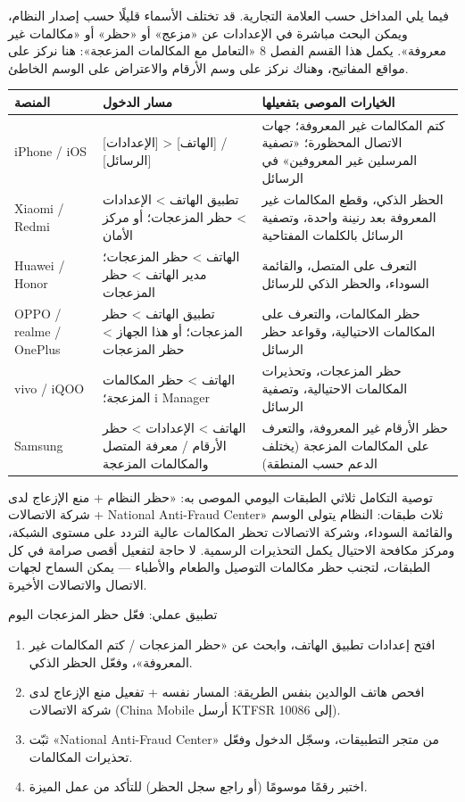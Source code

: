 
فيما يلي المداخل حسب العلامة التجارية. قد تختلف الأسماء قليلًا حسب إصدار النظام، ويمكن البحث مباشرة في الإعدادات عن «مزعج» أو «حظر» أو «مكالمات غير معروفة». يكمل هذا القسم الفصل 8 «التعامل مع المكالمات المزعجة»: هنا نركز على مواقع المفاتيح، وهناك نركز على وسم الأرقام والاعتراض على الوسم الخاطئ.

\begin{center}
\begin{tabularx}{\linewidth}{|X|X|X|}
\hline
\textbf{المنصة} & \textbf{مسار الدخول} & \textbf{الخيارات الموصى بتفعيلها} \tabularnewline
\hline
iPhone / iOS & {}[الإعدادات] > [الهاتف] / [الرسائل] & كتم المكالمات غير المعروفة؛ جهات الاتصال المحظورة؛ «تصفية المرسلين غير المعروفين» في الرسائل \tabularnewline
Xiaomi / Redmi & تطبيق الهاتف > الإعدادات > حظر المزعجات؛ أو مركز الأمان & الحظر الذكي، وقطع المكالمات غير المعروفة بعد رنينة واحدة، وتصفية الرسائل بالكلمات المفتاحية \tabularnewline
Huawei / Honor & الهاتف > حظر المزعجات؛ مدير الهاتف > حظر المزعجات & التعرف على المتصل، والقائمة السوداء، والحظر الذكي للرسائل \tabularnewline
OPPO / realme / OnePlus & تطبيق الهاتف > حظر المزعجات؛ أو هذا الجهاز > حظر المزعجات & حظر المكالمات، والتعرف على المكالمات الاحتيالية، وقواعد حظر الرسائل \tabularnewline
vivo / iQOO & الهاتف > حظر المكالمات المزعجة؛ i Manager & حظر المزعجات، وتحذيرات المكالمات الاحتيالية، وتصفية الرسائل \tabularnewline
Samsung & الهاتف > الإعدادات > حظر الأرقام / معرفة المتصل والمكالمات المزعجة & حظر الأرقام غير المعروفة، والتعرف على المكالمات المزعجة (يختلف الدعم حسب المنطقة) \tabularnewline
\hline
\end{tabularx}
\end{center}

\begin{tcbinfo}{توصية التكامل ثلاثي الطبقات}
اليومي الموصى به: «حظر النظام + منع الإزعاج لدى شركة الاتصالات + National Anti-Fraud Center» ثلاث طبقات: النظام يتولى الوسم والقائمة السوداء، وشركة الاتصالات تحظر المكالمات عالية التردد على مستوى الشبكة، ومركز مكافحة الاحتيال يكمل التحذيرات الرسمية. لا حاجة لتفعيل أقصى صرامة في كل الطبقات، لتجنب حظر مكالمات التوصيل والطعام والأطباء — يمكن السماح لجهات الاتصال والاتصالات الأخيرة.

\end{tcbinfo}

\begin{tcbpractice}{تطبيق عملي: فعّل حظر المزعجات اليوم}
\begin{enumerate}
  \item افتح إعدادات تطبيق الهاتف، وابحث عن «حظر المزعجات / كتم المكالمات غير المعروفة»، وفعّل الحظر الذكي.
  \item افحص هاتف الوالدين بنفس الطريقة: المسار نفسه + تفعيل منع الإزعاج لدى شركة الاتصالات (China Mobile أرسل KTFSR إلى 10086).
  \item ثبّت «National Anti-Fraud Center» من متجر التطبيقات، وسجّل الدخول وفعّل تحذيرات المكالمات.
  \item اختبر رقمًا موسومًا (أو راجع سجل الحظر) للتأكد من عمل الميزة.
\end{enumerate}

\end{tcbpractice}

